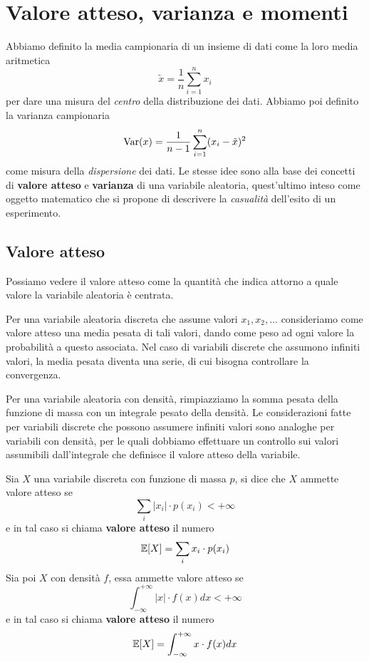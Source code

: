 \section{Valore atteso, varianza e momenti}
Abbiamo definito la media campionaria di un insieme di dati come la loro media aritmetica
\[ \tilde{x} = \frac{1}{n} \sum_{i=1}^n x_i \]
per dare una misura del \emph{centro} della distribuzione dei dati. Abbiamo poi definito la
varianza campionaria
\[ \operatorname{Var}(x) = \frac{1}{n-1} \sum_{i=1}^n (x_i - \tilde{x})^2 \]
come misura della \emph{dispersione} dei dati. Le stesse idee sono alla base dei concetti di
\textbf{valore atteso} e \textbf{varianza} di una variabile aleatoria, quest'ultimo inteso come
oggetto matematico che si propone di descrivere la \emph{casualità} dell'esito di un esperimento.

\subsection{Valore atteso}
Possiamo vedere il valore atteso come la quantità che indica attorno a quale valore la variabile
aleatoria è centrata.

Per una variabile aleatoria discreta che assume valori $x_1, x_2, \dots$ consideriamo come valore
atteso una media pesata di tali valori, dando come peso ad ogni valore la probabilità a questo
associata. Nel caso di variabili discrete che assumono infiniti valori, la media pesata diventa
una serie, di cui bisogna controllare la convergenza.

Per una variabile aleatoria con densità, rimpiazziamo la somma pesata della funzione di massa con
un integrale pesato della densità. Le considerazioni fatte per variabili discrete che possono
assumere infiniti valori sono analoghe per variabili con densità, per le quali dobbiamo effettuare
un controllo sui valori assumibili dall'integrale che definisce il valore atteso della variabile.

\begin{definition}
	Sia $X$ una variabile discreta con funzione di massa $p$, si dice che $X$ ammette valore atteso
	se
	\[ \sum_i |x_i| \cdot p(x_i) < +\infty \]
	e in tal caso si chiama \textbf{valore atteso} il numero
	\[ \mathbb{E}[X] = \sum_i x_i \cdot p(x_i) \]
	Sia poi $X$ con densità $f$, essa ammette valore atteso se
	\[ \int_{-\infty}^{+\infty} |x| \cdot f(x) dx < +\infty \]
	e in tal caso si chiama \textbf{valore atteso} il numero
	\[ \mathbb{E}[X] = \int_{-\infty}^{+\infty} x \cdot f(x) dx \]
\end{definition}

